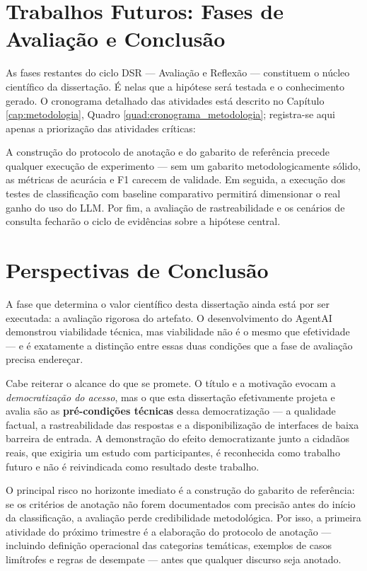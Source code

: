 \section{Trabalhos Futuros: Fases de Avaliação e Conclusão}

As fases restantes do ciclo DSR — Avaliação e Reflexão — constituem o núcleo científico da dissertação. É nelas que a hipótese será testada e o conhecimento gerado. O cronograma detalhado das atividades está descrito no Capítulo \ref{cap:metodologia}, Quadro \ref{quad:cronograma_metodologia}; registra-se aqui apenas a priorização das atividades críticas:

A construção do protocolo de anotação e do gabarito de referência precede qualquer execução de experimento — sem um gabarito metodologicamente sólido, as métricas de acurácia e F1 carecem de validade. Em seguida, a execução dos testes de classificação com baseline comparativo permitirá dimensionar o real ganho do uso do LLM. Por fim, a avaliação de rastreabilidade e os cenários de consulta fecharão o ciclo de evidências sobre a hipótese central.

\section{Perspectivas de Conclusão}

A fase que determina o valor científico desta dissertação ainda está por ser executada: a avaliação rigorosa do artefato. O desenvolvimento do AgentAI demonstrou viabilidade técnica, mas viabilidade não é o mesmo que efetividade — e é exatamente a distinção entre essas duas condições que a fase de avaliação precisa endereçar.

Cabe reiterar o alcance do que se promete. O título e a motivação evocam a \textit{democratização do acesso}, mas o que esta dissertação efetivamente projeta e avalia são as \textbf{pré-condições técnicas} dessa democratização --- a qualidade factual, a rastreabilidade das respostas e a disponibilização de interfaces de baixa barreira de entrada. A demonstração do efeito democratizante junto a cidadãos reais, que exigiria um estudo com participantes, é reconhecida como trabalho futuro e não é reivindicada como resultado deste trabalho.

O principal risco no horizonte imediato é a construção do gabarito de referência: se os critérios de anotação não forem documentados com precisão antes do início da classificação, a avaliação perde credibilidade metodológica. Por isso, a primeira atividade do próximo trimestre é a elaboração do protocolo de anotação — incluindo definição operacional das categorias temáticas, exemplos de casos limítrofes e regras de desempate — antes que qualquer discurso seja anotado.


